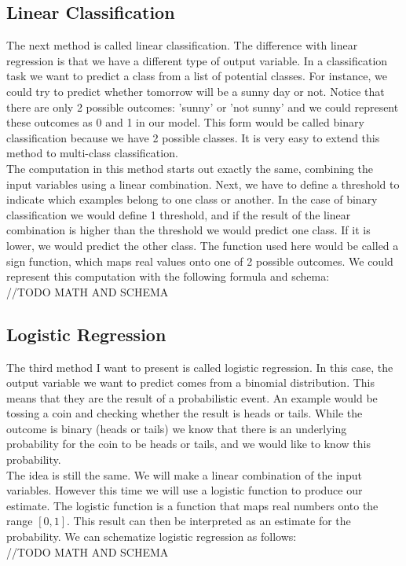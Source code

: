 \subsection{Linear Classification}
The next method is called linear classification. The difference with linear regression is that we have a different type of output variable. In a classification task we want to predict a class from a list of potential classes. For instance, we could try to predict whether tomorrow will be a sunny day or not. Notice that there are only 2 possible outcomes: 'sunny' or 'not sunny' and we could represent these outcomes as 0 and 1 in our model. This form would be called binary classification because we have 2 possible classes. It is very easy to extend this method to multi-class classification.\\
The computation in this method starts out exactly the same, combining the input variables using a linear combination. Next, we have to define a threshold to indicate which examples belong to one class or another. In the case of binary classification we would define 1 threshold, and if the result of the linear combination is higher than the threshold we would predict one class. If it is lower, we would predict the other class. The function used here would be called a sign function, which maps real values onto one of 2 possible outcomes. We could represent this computation with the following formula and schema: \\
//TODO MATH AND SCHEMA\\

\subsection{Logistic Regression}
The third method I want to present is called logistic regression. In this case, the output variable we want to predict comes from a binomial distribution. This means that they are the result of a probabilistic event. An example would be tossing a coin and checking whether the result is heads or tails. While the outcome is binary (heads or tails) we know that there is an underlying probability for the coin to be heads or tails, and we would like to know this probability. \\
The idea is still the same. We will make a linear combination of the input variables. However this time we will use a logistic function to produce our estimate. The logistic function is a function that maps real numbers onto the range $[0,1]$. This result can then be interpreted as an estimate for the probability. We can schematize logistic regression as follows:\\
//TODO MATH AND SCHEMA \\

